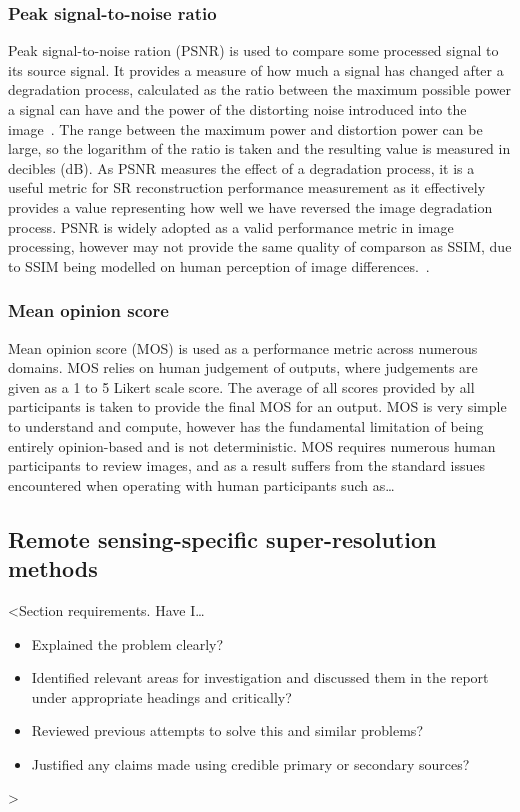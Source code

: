\subsubsection{Peak signal-to-noise ratio}
Peak signal-to-noise ration (PSNR) is used to compare some processed signal to its source signal. It provides a measure of how much a signal has changed after a degradation process, calculated as the ratio between the maximum possible power a signal can have and the power of the distorting noise introduced into the image~\cite{psnr}. The range between the maximum power and distortion power can be large, so the logarithm of the ratio is taken and the resulting value is measured in decibles (dB). As PSNR measures the effect of a degradation process, it is a useful metric for SR reconstruction performance measurement as it effectively provides a value representing how well we have reversed the image degradation process. PSNR is widely adopted as a valid performance metric in image processing, however may not provide the same quality of comparson as SSIM, due to SSIM being modelled on human perception of image differences.~\cite{psnrAnalysis}.

\subsubsection{Mean opinion score}
Mean opinion score (MOS) is used as a performance metric across numerous domains. MOS relies on human judgement of outputs, where judgements are given as a 1 to 5 Likert scale score. The average of all scores provided by all participants is taken to provide the final MOS for an output. MOS is very simple to understand and compute, however has the fundamental limitation of being entirely opinion-based and is not deterministic. MOS requires numerous human participants to review images, and as a result suffers from the standard issues encountered when operating with human participants such as\dots

\subsection{Remote sensing-specific super-resolution methods}
<Section requirements. Have I\dots
\begin{itemize}
    \item Explained the problem clearly?
    \item Identified relevant areas for investigation and discussed them in the report under appropriate headings and critically?
    \item Reviewed previous attempts to solve this and similar problems?
    \item Justified any claims made using credible primary or secondary sources?
\end{itemize}
>